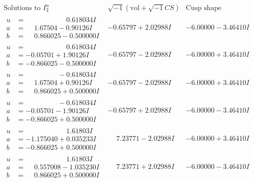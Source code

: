 \documentclass[1p]{elsarticle_modified}
\theoremstyle{definition}
\newcommand{\I}{\sqrt{-1}}
\begin{document}
$$\begin{array}{c|c|c}  
\text{Solutions to }I^u_{2}& \I (\text{vol} + \sqrt{-1}CS) & \text{Cusp shape}\\
 \hline 
\begin{aligned}
u &= \phantom{-0.000000 -}0.618034 I \\
a &= \phantom{-}1.67504 - 0.90126 I \\
b &= \phantom{-}0.866025 - 0.500000 I\end{aligned}
 & -0.65797 + 2.02988 I & -6.00000 - 3.46410 I \\ \hline\begin{aligned}
u &= \phantom{-0.000000 -}0.618034 I \\
a &= -0.05701 + 1.90126 I \\
b &= -0.866025 - 0.500000 I\end{aligned}
 & -0.65797 - 2.02988 I & -6.00000 + 3.46410 I \\ \hline\begin{aligned}
u &= \phantom{-0.000000 } -0.618034 I \\
a &= \phantom{-}1.67504 + 0.90126 I \\
b &= \phantom{-}0.866025 + 0.500000 I\end{aligned}
 & -0.65797 - 2.02988 I & -6.00000 + 3.46410 I \\ \hline\begin{aligned}
u &= \phantom{-0.000000 } -0.618034 I \\
a &= -0.05701 - 1.90126 I \\
b &= -0.866025 + 0.500000 I\end{aligned}
 & -0.65797 + 2.02988 I & -6.00000 - 3.46410 I \\ \hline\begin{aligned}
u &= \phantom{-0.000000 -}1.61803 I \\
a &= -1.175040 + 0.035233 I \\
b &= -0.866025 + 0.500000 I\end{aligned}
 & \phantom{-}7.23771 - 2.02988 I & -6.00000 + 3.46410 I \\ \hline\begin{aligned}
u &= \phantom{-0.000000 -}1.61803 I \\
a &= \phantom{-}0.557008 - 1.035230 I \\
b &= \phantom{-}0.866025 + 0.500000 I\end{aligned}
 & \phantom{-}7.23771 + 2.02988 I & -6.00000 - 3.46410 I \\ \hline\begin{aligned}

\end{aligned}
\end{array}$$
\end{document}
